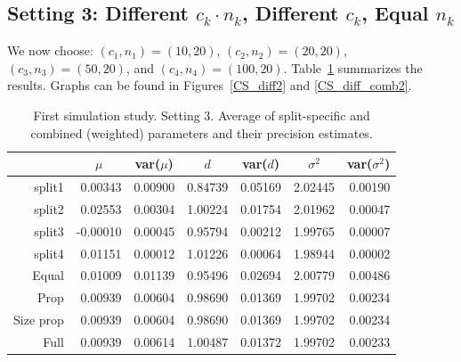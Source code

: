 \documentclass[11pt,a5paper,twoside]{book}
\begin{document}
{\subsection[Setting 3]{Setting 3: Different $c_k\cdot n_k$, Different $c_k$, Equal $n_k$}
We now choose: $(c_1,n_1)=(10,20)$,  $(c_2,n_2)=(20,20)$, $(c_3,n_3)=(50,20)$, and
$(c_4,n_4)=(100,20)$. Table~\ref{tab_diff2} summarizes the results. Graphs can be found in Figures~\ref{CS_diff2} and \ref{CS_diff_comb2}.
\begin{table}[h]
\centering
\caption{\small \linespread{1.1} First simulation study. Setting 3. Average of split-specific and combined (weighted) parameters and their precision estimates.}
\label{tab_diff2}

\vspace*{2mm}

\def\arraystretch{0.6} \begin{tabular}{rrrrrrr}
  \hline\hline
  & \multicolumn{1}{c}{$\mu$} & \multicolumn{1}{c}{\mbox{var}($\mu$)} & \multicolumn{1}{c}{$d$} & \multicolumn{1}{c}{\mbox{var}($d$)} & \multicolumn{1}{c}{$\sigma^2$} & \multicolumn{1}{c}{\mbox{var}($\sigma^2$)} \\
  \hline
split1 & 0.00343 & 0.00900 & 0.84739 & 0.05169 & 2.02445 & 0.00190 \\
  split2 & 0.02553 & 0.00304 & 1.00224 & 0.01754 & 2.01962 & 0.00047 \\
  split3 & -0.00010 & 0.00045 & 0.95794 & 0.00212 & 1.99765 & 0.00007 \\
  split4 & 0.01151 & 0.00012 & 1.01226 & 0.00064 & 1.98944 & 0.00002 \\
   \hline
 \hline
Equal & 0.01009 & 0.01139 & 0.95496 & 0.02694 & 2.00779 & 0.00486 \\
  Prop & 0.00939 & 0.00604 & 0.98690 & 0.01369 & 1.99702 & 0.00234 \\
  Size prop & 0.00939 & 0.00604 & 0.98690 & 0.01369 & 1.99702 & 0.00234 \\
  Full & 0.00939 & 0.00614 & 1.00487 & 0.01372 & 1.99702 & 0.00233 \\
 \hline\hline
\end{tabular}
\end{table}


}
\end{document}
